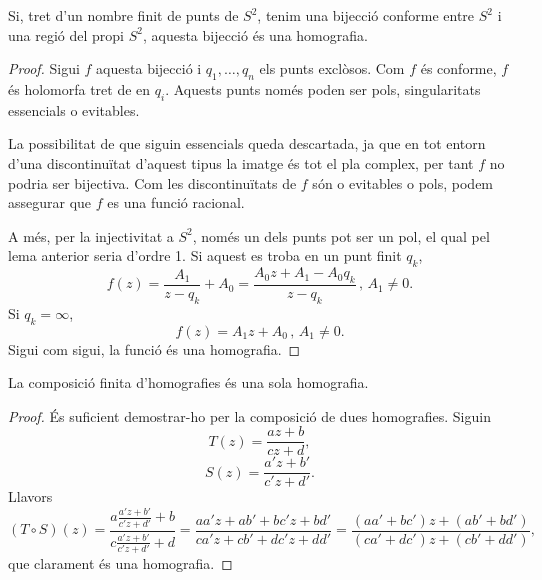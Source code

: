 \documentclass[dvipsnames, svgnames, leqno, a4paper, 12pt]{article}
\begin{document}
        \begin{theorem}
            Si, tret d'un nombre finit de punts de $S^2$, tenim una bijecció conforme entre $S^2$ i una regió del propi $S^2$, aquesta bijecció és una homografia.
        \end{theorem}

        \begin{proof}
            Sigui $f$ aquesta bijecció i $q_1,\dots,q_n$ els punts exclòsos. Com $f$ és conforme, $f$ és holomorfa tret de en $q_i$. Aquests punts només poden ser pols, singularitats essencials o evitables. 
            
            La possibilitat de que siguin essencials queda descartada, ja que en tot entorn d'una discontinuïtat d'aquest tipus la imatge és tot el pla complex, per tant $f$ no podria ser bijectiva. Com les discontinuïtats de $f$ són o evitables o pols, podem assegurar que $f$ es una funció racional. 
            
            A més, per la injectivitat a $S^2$, només un dels punts pot ser un pol, el qual pel lema anterior seria d'ordre 1. Si aquest es troba en un punt finit $q_k$, \begin{displaymath}
                f(z)=\frac{A_1}{z-q_k}+A_0=\frac{A_0z+A_1-A_0q_k}{z-q_k}\,\text{, } A_1\neq0.
            \end{displaymath}
            Si $q_k=\infty$, 
            \begin{displaymath}
                f(z)=A_1z+A_0\, \text{, } A_1\neq0.
            \end{displaymath}
            Sigui com sigui, la funció és una homografia.
        \end{proof}

        \begin{proposition}\label{prop:comp_homo}
            La composició finita d'homografies és una sola homografia.
        \end{proposition}

        \begin{proof}
            És suficient demostrar-ho per la composició de dues homografies. Siguin 
            \begin{displaymath}
                T(z)=\frac{az+b}{cz+d},
            \end{displaymath}
            \begin{displaymath}
                S(z)=\frac{a'z+b'}{c'z+d'}.
            \end{displaymath}
            Llavors
            \begin{displaymath}
                (T\circ S)(z)=\frac{a\frac{a'z+b'}{c'z+d'}+b}{c\frac{a'z+b'}{c'z+d'}+d}=\frac{aa'z+ab'+bc'z+bd'}{ca'z+cb'+dc'z+dd'}=\frac{\left( aa'+bc' \right)z+(ab'+bd')}{\left( ca'+dc' \right)z+(cb'+dd')},
            \end{displaymath}
            \normalsize
            que clarament és una homografia.
        \end{proof}
\end{document}
